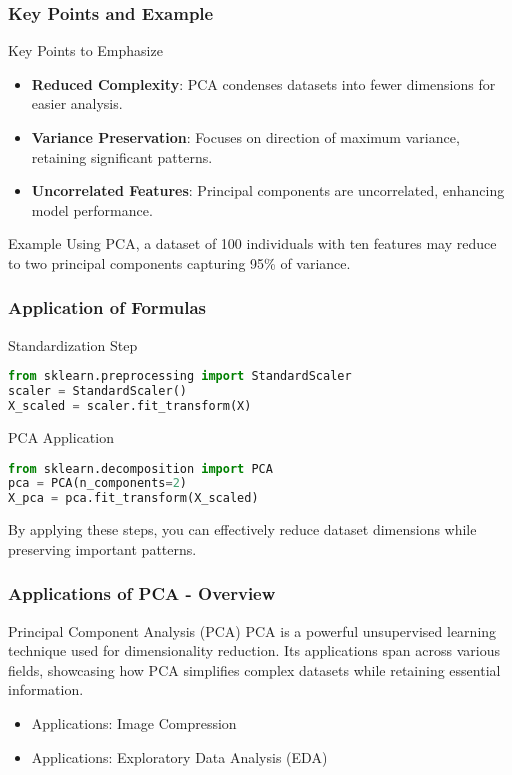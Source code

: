 \documentclass[aspectratio=169]{beamer}
\begin{document}
\begin{frame}[fragile]
    \frametitle{Key Points and Example}
    \begin{block}{Key Points to Emphasize}
        \begin{itemize}
            \item \textbf{Reduced Complexity}: PCA condenses datasets into fewer dimensions for easier analysis.
            \item \textbf{Variance Preservation}: Focuses on direction of maximum variance, retaining significant patterns.
            \item \textbf{Uncorrelated Features}: Principal components are uncorrelated, enhancing model performance.
        \end{itemize}
    \end{block}
    \begin{block}{Example}
        Using PCA, a dataset of 100 individuals with ten features may reduce to two principal components capturing 95\% of variance.
    \end{block}
\end{frame}

\begin{frame}[fragile]
    \frametitle{Application of Formulas}
    \begin{block}{Standardization Step}
    \begin{lstlisting}[language=Python]
from sklearn.preprocessing import StandardScaler
scaler = StandardScaler()
X_scaled = scaler.fit_transform(X)
    \end{lstlisting}
    \end{block}
    
    \begin{block}{PCA Application}
    \begin{lstlisting}[language=Python]
from sklearn.decomposition import PCA
pca = PCA(n_components=2)
X_pca = pca.fit_transform(X_scaled)
    \end{lstlisting}
    \end{block}

    By applying these steps, you can effectively reduce dataset dimensions while preserving important patterns.
\end{frame}

\begin{frame}[fragile]
    \frametitle{Applications of PCA - Overview}
    \begin{block}{Principal Component Analysis (PCA)}
        PCA is a powerful unsupervised learning technique used for dimensionality reduction. Its applications span across various fields, showcasing how PCA simplifies complex datasets while retaining essential information. 
    \end{block}
    \begin{itemize}
        \item Applications: Image Compression
        \item Applications: Exploratory Data Analysis (EDA)
    \end{itemize}
\end{frame}
\end{document}
